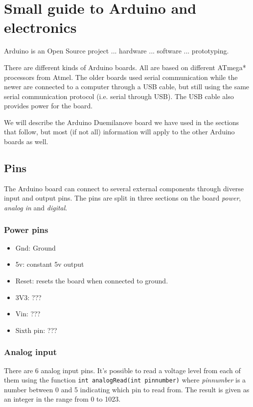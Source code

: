 \documentclass[a4paper,oneside, draft]{memoir}
\begin{document}



\appendix

\chapter{Small guide to Arduino and electronics}
Arduino is an Open Source project ... hardware ... software
... prototyping.


There are different kinds of Arduino boards. All are based on
different ATmega* processors from Atmel. The older boards used serial
communication while the newer are connected to a computer through a
USB cable, but still using the same serial communication protocol
(i.e. serial through USB). The USB cable also provides power for the
board.  

We will describe the Arduino Duemilanove board we have used in the
sections that follow, but most (if not all) information will apply to
the other Arduino boards as well.

\section{Pins}
The Arduino board can connect to several external components through
diverse input and output pins. The pins are split in three sections on
the board \textit{power}, \textit{analog in} and \textit{digital}.

\subsection{Power pins}
\begin{itemize}
\item Gnd: Ground
\item 5v: constant 5v output
\item Reset: resets the board when connected to ground. 
\item 3V3: ???
\item Vin: ???
\item Sixth pin: ???
\end{itemize}

\subsection{Analog input}
There are 6 analog input pins. It's possible to read a voltage level
from each of them using the function
\texttt{int analogRead(int pinnumber)} where \textit{pinnumber} is a
number between 0 and 5 indicating which pin to read from. The result is given
as an integer in the range from 0 to 1023.
\end{document}
